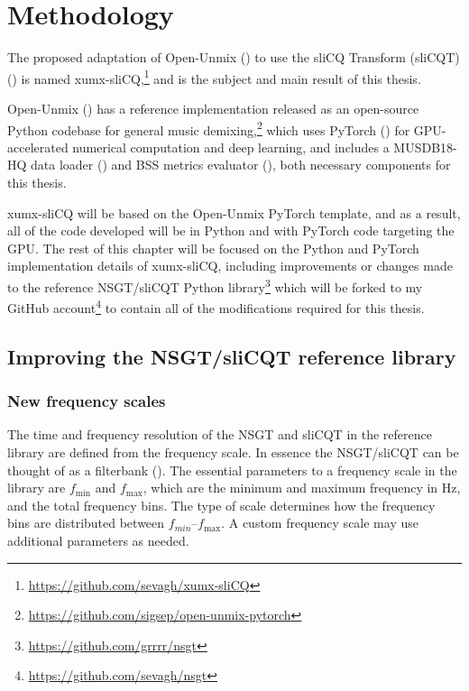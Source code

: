 \documentclass[report.tex]{subfiles}
\begin{document}
\section{Methodology}
\label{sec:methodology}

The proposed adaptation of Open-Unmix (\cite{umx}) to use the sliCQ Transform (sliCQT) (\cite{invertiblecqt, slicq}) is named xumx-sliCQ,\footnote{\url{https://github.com/sevagh/xumx-sliCQ}} and is the subject and main result of this thesis.

Open-Unmix (\cite{umx}) has a reference implementation released as an open-source Python codebase for general music demixing,\footnote{\url{https://github.com/sigsep/open-unmix-pytorch}} which uses PyTorch (\cite{pytorch}) for GPU-accelerated numerical computation and deep learning, and includes a MUSDB18-HQ data loader (\cite{musdb18hq}) and BSS metrics evaluator (\cite{bss}), both necessary components for this thesis.

xumx-sliCQ will be based on the Open-Unmix PyTorch template, and as a result, all of the code developed will be in Python and with PyTorch code targeting the GPU. The rest of this chapter will be focused on the Python and PyTorch implementation details of xumx-sliCQ, including improvements or changes made to the reference NSGT/sliCQT Python library\footnote{\url{https://github.com/grrrr/nsgt}} which will be forked to my GitHub account\footnote{\url{https://github.com/sevagh/nsgt}} to contain all of the modifications required for this thesis.

\subsection{Improving the NSGT/sliCQT reference library}
\label{sec:improvelib}

\subsubsection{New frequency scales}
\label{sec:freqscales}

The time and frequency resolution of the NSGT and sliCQT in the reference library are defined from the frequency scale. In essence the NSGT/sliCQT can be thought of as a filterbank (\cite{variableq1}). The essential parameters to a frequency scale in the library are $f_{\text{min}}$ and $f_{\text{max}}$, which are the minimum and maximum frequency in Hz, and the total frequency bins. The type of scale determines how the frequency bins are distributed between $f_{min}$--$f_{\text{max}}$. A custom frequency scale may use additional parameters as needed.
\end{document}
